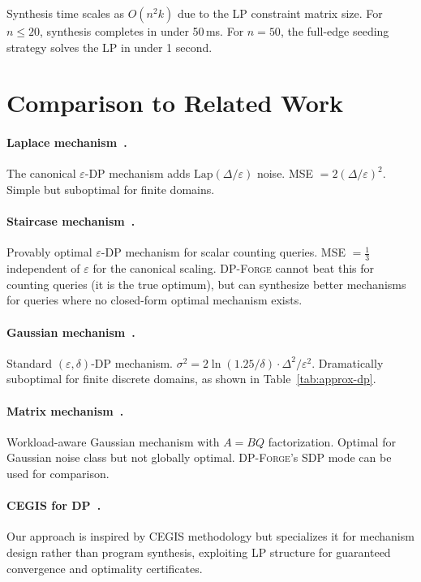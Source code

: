 \documentclass[11pt,a4paper]{article}
\begin{document}
Synthesis time scales as $O(n^2 k)$ due to the LP constraint matrix size.
For $n \le 20$, synthesis completes in under 50\,ms.  For $n = 50$,
the full-edge seeding strategy solves the LP in under 1 second.

\section{Comparison to Related Work}
\label{sec:related}

\paragraph{Laplace mechanism~\cite{dwork2006calibrating}.}
The canonical $\varepsilon$-DP mechanism adds $\mathrm{Lap}(\Delta/\varepsilon)$
noise.  MSE $= 2(\Delta/\varepsilon)^2$.  Simple but suboptimal for finite
domains.

\paragraph{Staircase mechanism~\cite{geng2014optimal}.}
Provably optimal $\varepsilon$-DP mechanism for scalar counting queries.
MSE $= \frac{1}{3}$ independent of $\varepsilon$ for the canonical scaling.
\textsc{DP-Forge} cannot beat this for counting queries (it is the true
optimum), but can synthesize better mechanisms for queries where no
closed-form optimal mechanism exists.

\paragraph{Gaussian mechanism~\cite{balle2018improving}.}
Standard $(\varepsilon,\delta)$-DP mechanism.
$\sigma^2 = 2\ln(1.25/\delta) \cdot \Delta^2 / \varepsilon^2$.
Dramatically suboptimal for finite discrete domains, as shown in
Table~\ref{tab:approx-dp}.

\paragraph{Matrix mechanism~\cite{li2015matrix}.}
Workload-aware Gaussian mechanism with $A = BQ$ factorization.
Optimal for Gaussian noise class but not globally optimal.
\textsc{DP-Forge}'s SDP mode can be used for comparison.

\paragraph{CEGIS for DP~\cite{narodytska2019learning}.}
Our approach is inspired by CEGIS methodology but specializes it for
mechanism design rather than program synthesis, exploiting LP structure
for guaranteed convergence and optimality certificates.
\end{document}

